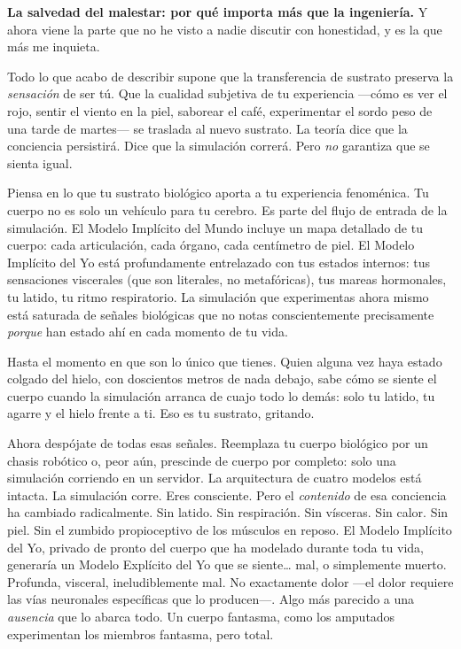 \documentclass[11pt, twoside, openright]{book}
\begin{document}
\textbf{La salvedad del malestar: por qué importa más que la ingeniería.} Y ahora viene la parte que no he visto a nadie discutir con honestidad, y es la que más me inquieta.

Todo lo que acabo de describir supone que la transferencia de sustrato preserva la \textit{sensación} de ser tú. Que la cualidad subjetiva de tu experiencia ---cómo es ver el rojo, sentir el viento en la piel, saborear el café, experimentar el sordo peso de una tarde de martes--- se traslada al nuevo sustrato. La teoría dice que la conciencia persistirá. Dice que la simulación correrá. Pero \textit{no} garantiza que se sienta igual.

Piensa en lo que tu sustrato biológico aporta a tu experiencia fenoménica. Tu cuerpo no es solo un vehículo para tu cerebro. Es parte del flujo de entrada de la simulación. El Modelo Implícito del Mundo incluye un mapa detallado de tu cuerpo: cada articulación, cada órgano, cada centímetro de piel. El Modelo Implícito del Yo está profundamente entrelazado con tus estados internos: tus sensaciones viscerales (que son literales, no metafóricas), tus mareas hormonales, tu latido, tu ritmo respiratorio. La simulación que experimentas ahora mismo está saturada de señales biológicas que no notas conscientemente precisamente \textit{porque} han estado ahí en cada momento de tu vida.

Hasta el momento en que son lo único que tienes. Quien alguna vez haya estado colgado del hielo, con doscientos metros de nada debajo, sabe cómo se siente el cuerpo cuando la simulación arranca de cuajo todo lo demás: solo tu latido, tu agarre y el hielo frente a ti. Eso es tu sustrato, gritando.

Ahora despójate de todas esas señales. Reemplaza tu cuerpo biológico por un chasis robótico o, peor aún, prescinde de cuerpo por completo: solo una simulación corriendo en un servidor. La arquitectura de cuatro modelos está intacta. La simulación corre. Eres consciente. Pero el \textit{contenido} de esa conciencia ha cambiado radicalmente. Sin latido. Sin respiración. Sin vísceras. Sin calor. Sin piel. Sin el zumbido propioceptivo de los músculos en reposo. El Modelo Implícito del Yo, privado de pronto del cuerpo que ha modelado durante toda tu vida, generaría un Modelo Explícito del Yo que se siente\ldots{} mal, o simplemente muerto. Profunda, visceral, ineludiblemente mal. No exactamente dolor ---el dolor requiere las vías neuronales específicas que lo producen---. Algo más parecido a una \textit{ausencia} que lo abarca todo. Un cuerpo fantasma, como los amputados experimentan los miembros fantasma, pero total.
\end{document}
